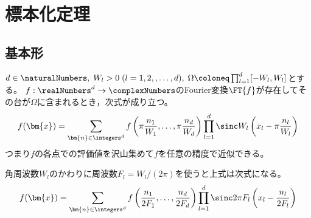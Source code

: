 \chapter{標本化定理}
    \section{基本形}
        \label{標本化定理の基本形}
        \begin{shadebox}
            $d\in\naturalNumbers,\;W_l>0\;(l=1,2,,\dots,d),\;\Omega\coloneq\prod_{l=1}^d [-W_l,W_l]$とする。
            $f:\realNumbers^d\to\complexNumbers$のFourier変換$\FT{f}$が存在してその台が$\Omega$に含まれるとき，次式が成り立つ。
            \[ f(\bm{x}) = \sum_{\bm{n}\in\integers^d}f\left(\pi\frac{n_1}{W_1},\dots,\pi\frac{n_d}{W_d}\right)\prod_{l=1}^d\sinc W_l\left(x_l - \pi\frac{n_l}{W_l}\right) \]
            つまり$f$の各点での評価値を沢山集めて$f$を任意の精度で近似できる。
            \par
            角周波数$W_l$のかわりに周波数$F_l=W_l/(2\pi)$を使うと上式は次式になる。
            \begin{equation}
                f(\bm{x}) = \sum_{\bm{n}\in\integers^d}f\left(\frac{n_1}{2F_1},\dots,\frac{n_d}{2F_d}\right)\prod_{l=1}^d\sinc 2\pi F_l\left(x_l - \frac{n_l}{2F_l}\right)
                \label{equation:標本化定理の基本形の周波数版}
            \end{equation}
        \end{shadebox}
